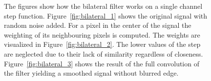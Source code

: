\begin{figure}[H]
\begin{subfigure}[b]{0.3\linewidth}
    \end{subfigure}
    \caption{The figures show how the bilateral filter works on a single channel step function. Figure~\ref{fig:bilateral_1} shows the original signal with random noise added. For a pixel in the center of the signal the weighting of its neighbouring pixels is computed. The weights are visualized in Figure~\ref{fig:bilateral_2}. The lower values of the step are neglected due to their lack of similarity regardless of closeness. Figure~\ref{fig:bilateral_3} shows the result of the full convolution of the filter yielding a smoothed signal without blurred edge.}\label{fig:bilateral_filter}
\end{figure}
